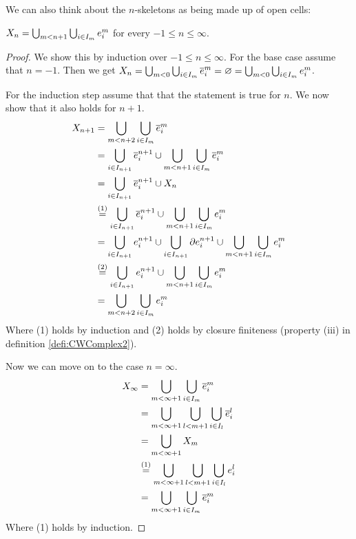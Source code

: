 We can also think about the $n$-skeletons as being made up of open cells:

\begin{lem}\label{lem:skeletonunionopenCell}
    $X_n = \bigcup_{m < n + 1}\bigcup_{i \in I_m} \openCell{m}{i}$ for every $-1 \le n \le \infty$.
\end{lem}
\begin{proof}
    We show this by induction over $-1 \le n \le \infty$.
    For the base case assume that $n = -1$.
    Then we get $X_n = \bigcup_{m < 0}\bigcup_{i \in I_m}\closedCell{m}{i} = \varnothing = \bigcup_{m < 0}\bigcup_{i \in I_m} \openCell{m}{i}$.

    For the induction step assume that that the statement is true for $n$.
    We now show that it also holds for $n + 1$.
    \begin{equation*}
        \begin{split}
            X_{n + 1} &= \bigcup_{m < n + 2}\bigcup_{i \in I_m} \closedCell{m}{i} \\
            &=\bigcup_{i \in I_{n + 1}}\closedCell{n+1}{i} \cup \bigcup_{m < n + 1}\bigcup_{i \in I_m} \closedCell{m}{i} \\
            &= \bigcup_{i \in I_{n + 1}}\closedCell{n+1}{i} \cup X_n \\
            &\stackrel{(1)}{=} \bigcup_{i \in I_{n + 1}}\closedCell{n+1}{i} \cup \bigcup_{m < n + 1}\bigcup_{i \in I_m} \openCell{m}{i} \\
            &= \bigcup_{i \in I_{n + 1}}\openCell{n+1}{i} \cup \bigcup_{i \in I_{n + 1}}\cellFrontier{n+1}{i} \cup \bigcup_{m < n + 1}\bigcup_{i \in I_m} \openCell{m}{i} \\
            &\stackrel{(2)}{=} \bigcup_{i \in I_{n + 1}}\openCell{n+1}{i} \cup \bigcup_{m < n + 1}\bigcup_{i \in I_m} \openCell{m}{i} \\
            &= \bigcup_{m < n + 2}\bigcup_{i \in I_m} \openCell{m}{i}
        \end{split}
    \end{equation*}
    Where (1) holds by induction and (2) holds by closure finiteness (property (iii) in definition \ref{defi:CWComplex2}).

    Now we can move on to the case $n = \infty$.
    \begin{equation*}
        \begin{split}
            X_{\infty} &= \bigcup_{m < \infty + 1}\bigcup_{i \in I_m}\closedCell{m}{i} \\
            &= \bigcup_{m < \infty + 1}\bigcup_{l < m + 1}\bigcup_{i \in I_l}\closedCell{l}{i} \\
            &= \bigcup_{m < \infty + 1} X_m \\
            &\stackrel{(1)}{=} \bigcup_{m < \infty + 1}\bigcup_{l < m + 1}\bigcup_{i \in I_l}\openCell{l}{i} \\
            &= \bigcup_{m < \infty + 1}\bigcup_{i \in I_m}\closedCell{m}{i}
        \end{split}
    \end{equation*}
    Where (1) holds by induction.
\end{proof}

